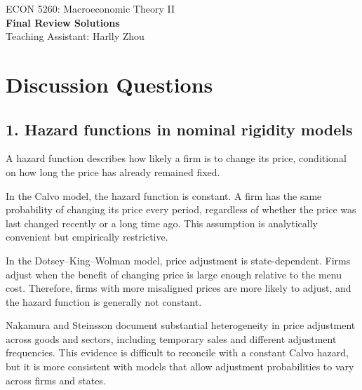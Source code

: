 \documentclass[12pt]{article}
\begin{document}
\begin{center}
    ECON 5260: Macroeconomic Theory II\\
    {\large \textbf{Final Review Solutions}}\\
    Teaching Assistant: Harlly Zhou
\end{center}


\section*{Discussion Questions}

\subsection*{1. Hazard functions in nominal rigidity models}

A hazard function describes how likely a firm is to change its price, conditional on how long the price has already remained fixed.

In the Calvo model, the hazard function is constant. A firm has the same probability of changing its price every period, regardless of whether the price was last changed recently or a long time ago. This assumption is analytically convenient but empirically restrictive.

In the Dotsey--King--Wolman model, price adjustment is state-dependent. Firms adjust when the benefit of changing price is large enough relative to the menu cost. Therefore, firms with more misaligned prices are more likely to adjust, and the hazard function is generally not constant.

Nakamura and Steinsson document substantial heterogeneity in price adjustment across goods and sectors, including temporary sales and different adjustment frequencies. This evidence is difficult to reconcile with a constant Calvo hazard, but it is more consistent with models that allow adjustment probabilities to vary across firms and states.







\end{document}
